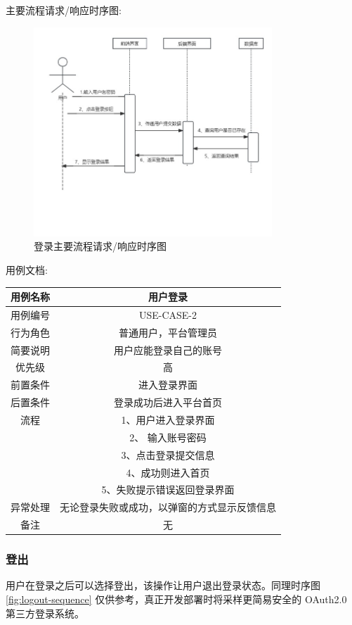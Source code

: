 \documentclass[12pt]{ctexart} %
\begin{document}
主要流程请求/响应时序图:

\begin{figure}[ht]
  \centering
  \includegraphics[width=0.8\textwidth]{yongli2.jpg}
  \caption{登录主要流程请求/响应时序图}
  \label{fig:login-sequence} %
\end{figure}

用例文档:

\begin{tabular}{|c|c|}
  \hline
  用例名称& 用户登录\\
  \hline
  用例编号 & USE-CASE-2\\
  \hline
  行为角色 & 普通用户，平台管理员\\
  \hline
  简要说明 & 用户应能登录自己的账号\\
  \hline
  优先级 & 高\\
  \hline
  前置条件 & 进入登录界面\\
  \hline
  后置条件 & 登录成功后进入平台首页\\
  \hline
  流程 & 1、用户进入登录界面\\
      & 2、 输入账号密码\\
      & 3、点击登录提交信息\\
      & 4、成功则进入首页\\
      & 5、失败提示错误返回登录界面\\
  \hline
  异常处理 & 无论登录失败或成功，以弹窗的方式显示反馈信息\\
  \hline
  备注 & 无\\
  \hline
\end{tabular}

\subsubsection{登出}
用户在登录之后可以选择登出，该操作让用户退出登录状态。同理时序图 \ref{fig:logout-sequence} 仅供参考，真正开发部署时将采样更简易安全的 OAuth2.0 第三方登录系统。
\end{document}
